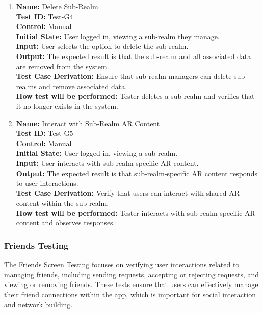 \documentclass[12pt, titlepage]{article}
\begin{document}
\begin{enumerate}
    \item \textbf{Name:} {Delete Sub-Realm} \label{itm:Test-G4}\\
    \textbf{Test ID:} Test-G4\\
    \textbf{Control:} Manual \\
    \textbf{Initial State:} User logged in, viewing a sub-realm they manage. \\
    \textbf{Input:} User selects the option to delete the sub-realm. \\
    \textbf{Output:} The expected result is that the sub-realm and all associated data are removed from the system. \\
    \textbf{Test Case Derivation:} Ensure that sub-realm managers can delete sub-realms and remove associated data. \\
    \textbf{How test will be performed:} Tester deletes a sub-realm and verifies that it no longer exists in the system.

    \item \textbf{Name:} {Interact with Sub-Realm AR Content} \label{itm:Test-G5}\\
    \textbf{Test ID:} Test-G5\\
    \textbf{Control:} Manual \\
    \textbf{Initial State:} User logged in, viewing a sub-realm. \\
    \textbf{Input:} User interacts with sub-realm-specific AR content. \\
    \textbf{Output:} The expected result is that sub-realm-specific AR content responds to user interactions. \\
    \textbf{Test Case Derivation:} Verify that users can interact with shared AR content within the sub-realm. \\
    \textbf{How test will be performed:} Tester interacts with sub-realm-specific AR content and observes responses.

\end{enumerate}

\subsubsection{Friends Testing}
\label{sec:friends_screen_testing}

The Friends Screen Testing focuses on verifying user interactions related to managing friends, including sending requests, accepting or rejecting requests, and viewing or removing friends. These tests ensure that users can effectively manage their friend connections within the app, which is important for social interaction and network building.
\end{document}
